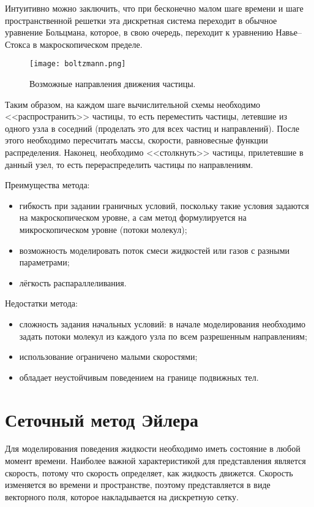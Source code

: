 Интуитивно можно заключить, что при бесконечно малом шаге времени и шаге пространственной решетки эта дискретная система переходит в обычное уравнение Больцмана, которое, в свою очередь, переходит к уравнению Навье--Стокса в макроскопическом пределе.

\begin{figure}[h]
  \centering
  \texttt{[image: boltzmann.png]}
  \caption{Возможные направления движения частицы.}
\end{figure}

Таким образом, на каждом шаге вычислительной схемы необходимо <<распространить>> частицы, то есть переместить частицы, летевшие из одного узла в соседний (проделать это для всех частиц и направлений). После этого необходимо пересчитать массы, скорости, равновесные функции распределения. Наконец, необходимо <<столкнуть>> частицы, прилетевшие в данный узел, то есть перераспределить частицы по направлениям.

Преимущества метода:
\begin{itemize}
  \item гибкость при задании граничных условий, поскольку такие условия задаются на макроскопическом уровне, а сам метод формулируется на микроскопическом уровне (потоки молекул);
  \item возможность моделировать поток смеси жидкостей или газов с разными параметрами;
  \item лёгкость распараллеливания.
\end{itemize}

Недостатки метода:
\begin{itemize}
  \item сложность задания начальных условий: в начале моделирования необходимо задать потоки молекул из каждого узла по всем разрешенным направлениям;
  \item использование ограничено малыми скоростями;
  \item обладает неустойчивым поведением на границе подвижных тел.
\end{itemize}


\section{Сеточный метод Эйлера}
Для моделирования поведения жидкости необходимо иметь состояние в любой момент времени. Наиболее важной характеристикой для представления является скорость, потому что скорость определяет, как жидкость движется. Скорость изменяется во времени и пространстве, поэтому представляется в виде векторного поля, которое накладывается на дискретную сетку.

